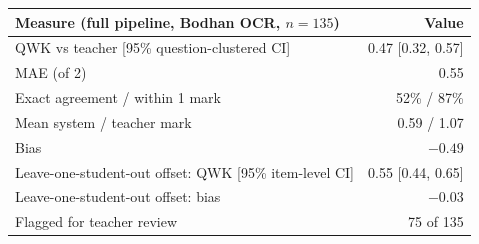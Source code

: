 \begin{tabular}{lr}
\toprule
Measure (full pipeline, Bodhan OCR, $n=135$) & Value \\
\midrule
QWK vs teacher [95\% question-clustered CI] & 0.47 [0.32, 0.57] \\
MAE (of 2) & 0.55 \\
Exact agreement / within 1 mark & 52\% / 87\% \\
Mean system / teacher mark & 0.59 / 1.07 \\
Bias & $-0.49$ \\
Leave-one-student-out offset: QWK [95\% item-level CI] & 0.55 [0.44, 0.65] \\
Leave-one-student-out offset: bias & $-0.03$ \\
Flagged for teacher review & 75 of 135 \\
\bottomrule
\end{tabular}
